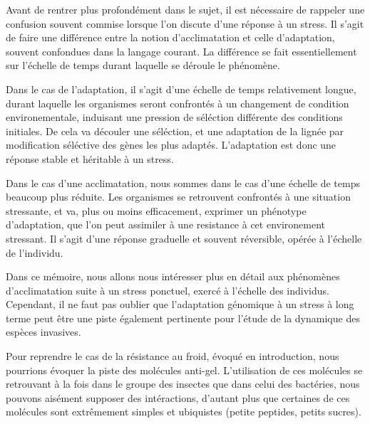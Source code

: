 Avant de rentrer plus profondément dans le sujet, il est nécessaire de
rappeler une confusion souvent commise lorsque l'on discute d'une réponse à un
stress. Il s'agit de faire une différence entre la notion d'acclimatation et
celle d'adaptation, souvent confondues dans la langage courant. La différence
se fait essentiellement sur l'échelle de temps durant laquelle se déroule le
phénomène.

Dans le cas de l'adaptation, il s'agit d'une échelle de temps relativement
longue, durant laquelle les organismes seront confrontés à un changement de
condition environementale, induisant une pression de séléction différente des
conditions initiales. De cela va découler une séléction, et une adaptation de
la lignée par modification séléctive des gènes les plus adaptés. L'adaptation
est donc une réponse stable et héritable à un stress.

Dans le cas d'une acclimatation, nous sommes dans le cas d'une échelle de
temps beaucoup plus réduite. Les organismes se retrouvent confrontés à une
situation stressante, et va, plus ou moins efficacement, exprimer un phénotype
d'adaptation, que l'on peut assimiler à une resistance à cet environement
stressant. Il s'agit d'une réponse graduelle et souvent réversible, opérée à
l'échelle de l'individu.



Dans ce mémoire, nous allons nous intéresser plus en détail aux phénomènes
d'acclimatation suite à un stress ponctuel, exercé à l'échelle des individus.
Cependant, il ne faut pas oublier que l'adaptation génomique à un stress à
long terme peut être une piste également pertinente pour l'étude de la
dynamique des espèces invasives.

Pour reprendre le cas de la résistance au froid, évoqué en introduction, nous
pourrions évoquer la piste des molécules anti-gel. L'utilisation de ces
molécules se retrouvant à la fois dans le groupe des insectes\cite{duman2001}
que dans celui des bactéries\cite{xu1998}, nous pouvons aisément supposer des
intéractions, d'autant plus que certaines de ces molécules sont extrêmement
simples et ubiquistes (petite peptides, petits sucres).

